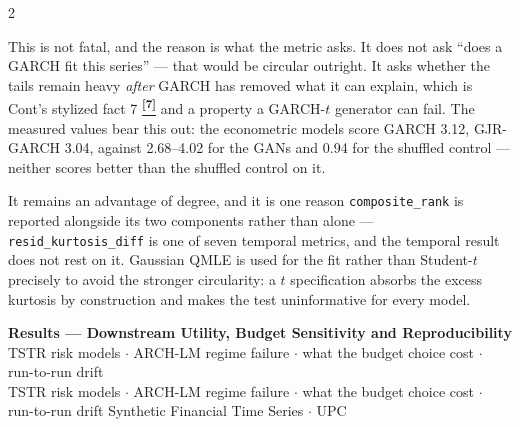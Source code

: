 \documentclass[10pt]{article}
\newcommand{\pagehead}[2]{%
  \begin{tcolorbox}[enhanced,arc=0pt,outer arc=0pt,boxrule=0pt,
    colback=Navy,colframe=Navy,
    top=5pt,bottom=5pt,left=8pt,right=8pt,
    before skip=0pt,after skip=10pt]
  {\color{white}\large\bfseries #1}%
  \ifx\relax#2\relax\else\\[1pt]{\color{blue!30!white}\small #2}\fi
  \hfill{\color{blue!20!white}\footnotesize Synthetic Financial Time Series $\cdot$ UPC}
  \end{tcolorbox}}
\newcommand{\tcite}[1]{%
  \hyperlink{R:#1}{\textsuperscript{\scriptsize\textbf{[#1]}}}}
\begin{document}
\begin{multicols}{2}
{\smallskip
This is not fatal, and the reason is what the metric asks. It does not ask ``does a GARCH fit this series'' --- that would be circular outright. It asks whether the tails remain heavy \emph{after} GARCH has removed what it can explain, which is Cont's stylized fact 7\tcite{7} and a property a GARCH-$t$ generator can fail. The measured values bear this out: the econometric models score GARCH 3.12, GJR-GARCH 3.04, against 2.68--4.02 for the GANs and 0.94 for the shuffled control --- neither scores better than the shuffled control on it.

\smallskip
It remains an advantage of degree, and it is one reason \texttt{composite\_rank} is reported alongside its two components rather than alone --- \texttt{resid\_kurtosis\_diff} is one of seven temporal metrics, and the temporal result does not rest on it. Gaussian QMLE is used for the fit rather than Student-$t$ precisely to avoid the stronger circularity: a $t$ specification absorbs the excess kurtosis by construction and makes the test uninformative for every model.}

\end{multicols}

\clearpage

\pagehead{Results --- Downstream Utility, Budget Sensitivity and Reproducibility}
         {TSTR risk models $\cdot$ ARCH-LM regime failure $\cdot$ what the budget choice cost $\cdot$ run-to-run drift}
\end{document}
